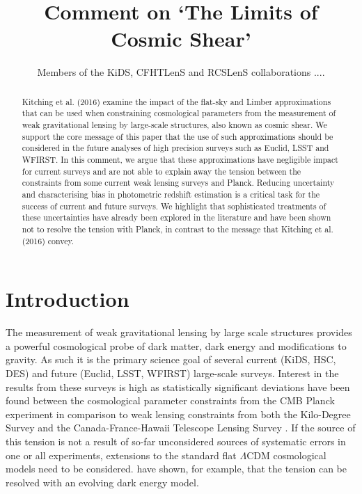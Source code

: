 \documentclass[preprint]{aastex}
\begin{document}
\title{\huge{Comment on `The Limits of Cosmic Shear'}}

\author{Members of the KiDS, CFHTLenS and RCSLenS collaborations ....}


\begin{abstract}
Kitching et al. (2016) examine the impact of the flat-sky and Limber approximations that can be used when constraining cosmological parameters from the measurement of weak gravitational lensing by large-scale structures, also known as cosmic shear.  We support the core message of this paper that the use of such approximations should be considered in the future analyses of high precision surveys such as Euclid, LSST and WFIRST.  In this comment, we argue that these approximations have negligible impact for current surveys and are not able to explain away the tension between the constraints from some current weak lensing surveys and Planck.  Reducing uncertainty and characterising bias in photometric redshift estimation is a critical task for the success of current and future surveys.  We highlight that sophisticated treatments of these uncertainties have already been explored in the literature and have been shown not to resolve the tension with Planck, in contrast to the message that Kitching et al. (2016) convey.

\end{abstract}
\section{Introduction}

The measurement of weak gravitational lensing by large scale structures provides a powerful cosmological probe of dark matter, dark energy and modifications to gravity.  As such it is the primary science goal of several current (KiDS, HSC, DES) and future (Euclid, LSST, WFIRST) large-scale surveys.   Interest in the results from these surveys is high as statistically significant deviations have been found between the cosmological parameter constraints from the CMB Planck experiment \citep{planck/cosmo:2015} in comparison to weak lensing constraints from both the Kilo-Degree Survey \citep[KiDS;][]{hildebrandt/etal:2016} and the Canada-France-Hawaii Telescope Lensing Survey \citep[CFHTLenS;][] {joudaki/etal:2016}.  If the source of this tension is not a result of so-far unconsidered sources of systematic errors in one or all experiments, extensions to the standard flat $\Lambda$CDM cosmological models need to be considered.  \citet{joudaki/etal:2017} have shown, for example, that the tension can be resolved with an evolving dark energy model.
\end{document}
